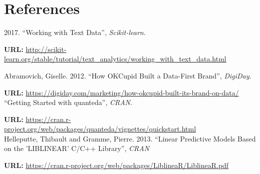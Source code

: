 \documentclass[a4paper,12pt]{article}
\begin{document}
\section{References}

2017. ``Working with Text Data'', \textit{Scikit-learn}.

\textbf{URL:} \url{http://scikit-learn.org/stable/tutorial/text_analytics/working_with_text_data.html}

\noindent Abramovich, Giselle. 2012. ``How OKCupid Built a Data-First Brand'', \textit{DigiDay}.

\textbf{URL:} \url{https://digiday.com/marketing/how-okcupid-built-its-brand-on-data/} \\

\noindent ``Getting Started with quanteda'', \textit{CRAN}.

\textbf{URL:} \url{https://cran.r-project.org/web/packages/quanteda/vignettes/quickstart.html} \\

\noindent  Helleputte, Thibault and Gramme, Pierre. 2013. ``Linear Predictive Models Based on the 'LIBLINEAR' C/C++ Library'', \textit{CRAN}

\textbf{URL:} \url{https://cran.r-project.org/web/packages/LiblineaR/LiblineaR.pdf} \\
\end{document}

